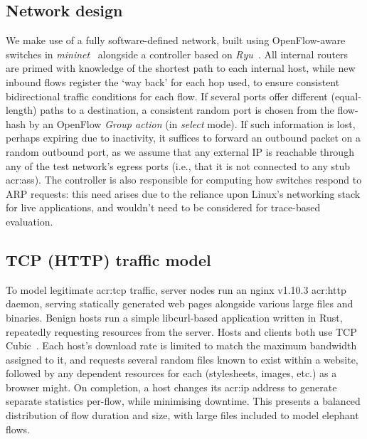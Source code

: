 \subsection{Network design}
We make use of a fully software-defined network, built using OpenFlow-aware switches in \emph{mininet}~\parencite{mininet} alongside a controller based on \emph{Ryu}~\parencite{ryu}.
All internal routers are primed with knowledge of the shortest path to each internal host, while new inbound flows register the `way back' for each hop used, to ensure consistent bidirectional traffic conditions for each flow.
If several ports offer different (equal-length) paths to a destination, a consistent random port is chosen from the flow-hash by an OpenFlow \emph{Group action} (in \emph{select} mode).
If such information is lost, perhaps expiring due to inactivity, it suffices to forward an outbound packet on a random outbound port, as we assume that any external IP is reachable through any of the test network's egress ports (i.e., that it is not connected to any stub \glspl{acr:as}).
The controller is also responsible for computing how switches respond to ARP requests: this need arises due to the reliance upon Linux's networking stack for live applications, and wouldn't need to be considered for trace-based evaluation.

\subsection{TCP (HTTP) traffic model}\label{sec:tcp-http-traffic-model}
To model legitimate \gls{acr:tcp} traffic, server nodes run an nginx v1.10.3 \gls{acr:http} daemon, serving statically generated web pages alongside various large files and binaries.
Benign hosts run a simple libcurl-based application written in Rust, repeatedly requesting resources from the server.
Hosts and clients both use TCP Cubic~\parencite{rfc8312}.
Each host's download rate is limited to match the maximum bandwidth assigned to it, and requests several random files known to exist within a website, followed by any dependent resources for each (stylesheets, images, etc.) as a browser might.
On completion, a host changes its \gls{acr:ip} address to generate separate statistics per-flow, while minimising downtime.
This presents a balanced distribution of flow duration and size, with large files included to model elephant flows.


